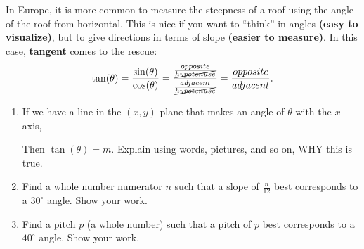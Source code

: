 \documentclass[noauthor,nooutcomes,hints,handout]{ximera}
\begin{document}
\begin{question}
In Europe, it is more common to measure the steepness of a roof using
the angle of the roof from horizontal. This is nice if you want to
``think'' in angles \textbf{(easy to visualize)}, but to give directions
in terms of slope \textbf{(easier to measure)}. In this case,
\textbf{tangent} comes to the rescue:
\[
\tan(\theta) = \frac{\sin(\theta)}{\cos(\theta)} = \frac{\frac{opposite}{\cancel{hypotenuse}}}{\frac{adjacent}{\cancel{hypotenuse}}}=\frac{opposite}{adjacent}.
\]



\begin{enumerate}
\item If we have a line in the $(x,y)$-plane that makes an angle of
  $\theta$ with the $x$-axis,
  \begin{center}
  \end{center}
  Then $\tan(\theta) = m$. Explain using words, pictures, and so on,
  WHY this is true.
\item Find a whole number numerator $n$ such that a slope of
  $\frac{n}{12}$ best corresponds to a $30^\circ$ angle. Show your
  work.
\item Find a pitch $p$ (a whole number) such that a pitch of $p$ best
  corresponds to a $40^\circ$ angle. Show your work.
\end{enumerate}
\end{question}
\mynewpage
\end{document}
